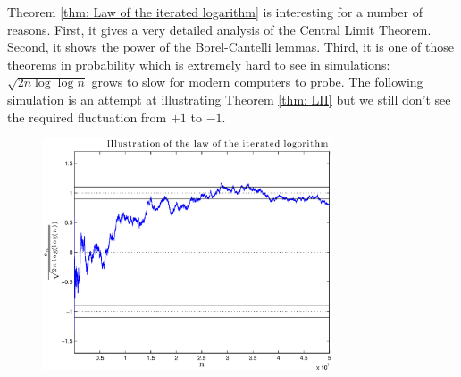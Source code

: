  Theorem \ref{thm: Law of the iterated logarithm} is interesting for a number of reasons. First, it gives a very detailed analysis of the Central Limit Theorem. Second, it shows the power of the Borel-Cantelli lemmas. Third, it is one of those theorems in probability which is extremely hard to see in simulations: $\sqrt{2n\log\log n}$ grows to slow for modern computers to probe. The following simulation is an attempt at illustrating  Theorem \ref{thm: LII} but we still don't see the required fluctuation from $+1$ to $-1$.
\begin{figure}[h]
\includegraphics[height = 2.7in]{Measure/LIL.eps}
\end{figure}


